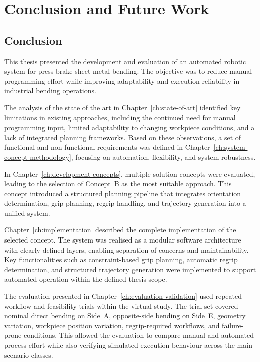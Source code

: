 \chapter{Conclusion and Future Work}
\label{ch:conclusion-future-work}

\section{Conclusion}
\label{sec:thesis-conclusion}

This thesis presented the development and evaluation of an automated robotic system for press brake sheet metal bending. The objective was to reduce manual programming effort while improving adaptability and execution reliability in industrial bending operations.

The analysis of the state of the art in Chapter~\ref{ch:state-of-art} identified key limitations in existing approaches, including the continued need for manual programming input, limited adaptability to changing workpiece conditions, and a lack of integrated planning frameworks. Based on these observations, a set of functional and non-functional requirements was defined in Chapter~\ref{ch:system-concept-methodology}, focusing on automation, flexibility, and system robustness.

In Chapter~\ref{ch:development-concepts}, multiple solution concepts were evaluated, leading to the selection of Concept~B as the most suitable approach. This concept introduced a structured planning pipeline that integrates orientation determination, grip planning, regrip handling, and trajectory generation into a unified system.

Chapter~\ref{ch:implementation} described the complete implementation of the selected concept. The system was realised as a modular software architecture with clearly defined layers, enabling separation of concerns and maintainability. Key functionalities such as constraint-based grip planning, automatic regrip determination, and structured trajectory generation were implemented to support automated operation within the defined thesis scope.

The evaluation presented in Chapter~\ref{ch:evaluation-validation} used repeated workflow and feasibility trials within the virtual study. The trial set covered nominal direct bending on Side~A, opposite-side bending on Side~E, geometry variation, workpiece position variation, regrip-required workflows, and failure-prone conditions. This allowed the evaluation to compare manual and automated process effort while also verifying simulated execution behaviour across the main scenario classes.

